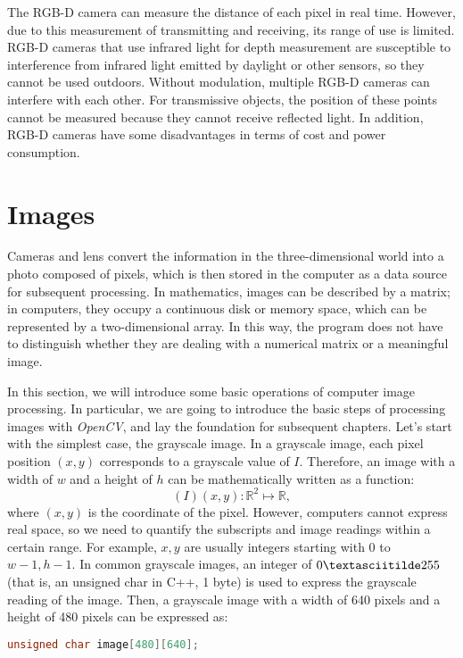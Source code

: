 The RGB-D camera can measure the distance of each pixel in real time. However, due to this measurement of transmitting and receiving, its range of use is limited. RGB-D cameras that use infrared light for depth measurement are susceptible to interference from infrared light emitted by daylight or other sensors, so they cannot be used outdoors. Without modulation, multiple RGB-D cameras can interfere with each other. For transmissive objects, the position of these points cannot be measured because they cannot receive reflected light. In addition, RGB-D cameras have some disadvantages in terms of cost and power consumption.

\section{Images}
Cameras and lens convert the information in the three-dimensional world into a photo composed of pixels, which is then stored in the computer as a data source for subsequent processing. In mathematics, images can be described by a matrix; in computers, they occupy a continuous disk or memory space, which can be represented by a two-dimensional array. In this way, the program does not have to distinguish whether they are dealing with a numerical matrix or a meaningful image.

In this section, we will introduce some basic operations of computer image processing. In particular, we are going to introduce the basic steps of processing images with \textit{OpenCV}, and lay the foundation for subsequent chapters. Let's start with the simplest case, the grayscale image. In a grayscale image, each pixel position $ (x, y) $ corresponds to a grayscale value of $ I $. Therefore, an image with a width of $ w $ and a height of $ h $ can be mathematically written as a function:
\[
(I) (x, y): \mathbb {R} ^ 2 \mapsto \mathbb {R},
\]
where $ (x, y) $ is the coordinate of the pixel. However, computers cannot express real space, so we need to quantify the subscripts and image readings within a certain range. For example, $ x, y $ are usually integers starting with 0 to $w-1, h-1$. In common grayscale images, an integer of $0 \textasciitilde 255$ (that is, an unsigned char in C++, 1 byte) is used to express the grayscale reading of the image. Then, a grayscale image with a width of 640 pixels and a height of 480 pixels can be expressed as:
\begin{lstlisting}[language=C++, caption=Use 2D array to express an image]
unsigned char image[480][640];
\end{lstlisting}

